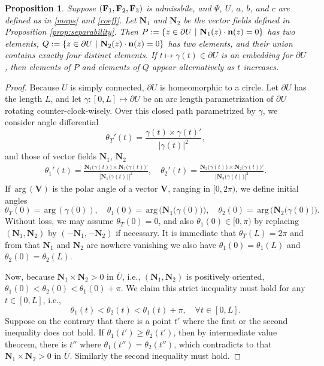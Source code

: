 \documentclass[11pt]{amsart}
\theoremstyle{plain}
\newtheorem{Prop}[Thm]{Proposition}
\theoremstyle{remark}
\numberwithin{equation}{section}
\numberwithin{Thm}{section}
\def\N{{\mathbf N}}
\def\F{{\bf F}}
\def\n{{\bf n}}
\def\arg{{\,\textrm{arg}\,}}
\begin{document}
\begin{Prop} \label{lemma:anisogeom}
Suppose $(\F_1,\F_2,\F_3)$ is admissbile, and $\Psi$, $U$, $a$, $b$, and $c$ are defined as in \eqref{maps} and \eqref{coeff}. Let $\N_1$ and $\N_2$ be the vector fields defined in Proposition \ref{prop:separability}. 
Then $P:=\left\{ z\in \partial U ~|~ \N_1(z)\cdot \n(z) = 0\right\}$ has two elements, $Q:=\left\{ z\in \partial U ~|~ \N_2(z)\cdot \n(z) = 0\right\}$ has two elements, and their union contains exactly four distinct elements. If $t \mapsto \gamma(t) \in \partial U$ is an embedding for $\partial U$, then elements of $P$ and elements of $Q$ appear alternatively as $t$ increases.
\end{Prop}
\begin{proof}
 Because $U$ is simply connected, $\partial U$ is homeomorphic to a circle. Let $\partial U$ has the length $L$, and let $\gamma : [0,L] \mapsto \partial U$ be an arc length parametrization of $\partial U$ rotating counter-clock-wisely.  Over this closed path parametrized by $\gamma$,  we consider angle differential 
 $$\theta_T'(t) = \frac{\gamma(t) \times \gamma(t)'}{|\gamma(t)|^2},$$
 and those of vector fields $\N_1$, $\N_2$
\begin{align*}
  \theta_1'(t) = \frac{\N_1\big(\gamma(t)\big) \times \N_1\big(\gamma(t)\big)'}{|\N_1\big(\gamma(t)\big)|^2}, \quad  \theta_2'(t) = \frac{\N_2\big(\gamma(t)\big) \times \N_2\big(\gamma(t)\big)'}{|\N_2\big(\gamma(t)\big)|^2}.
 \end{align*}
If $\arg(\mathbf{V})$ is the polar angle of a vector $\mathbf{V}$, ranging in $[0,2\pi)$, we define initial angles 
$$\theta_T(0) = \arg(\gamma(0)), \quad \theta_1(0) = \arg\Big(\N_1\big(\gamma(0)\big)\Big),\quad \theta_2(0) = \arg\Big(\N_2\big(\gamma(0)\big)\Big).$$
Without loss, we may assume $\theta_T(0) = 0$, and also $\theta_1(0) \in [0,\pi)$ by replacing $(\N_1,\N_2)$ by $(-\N_1,-\N_2)$ if necessary. It is immediate that $\theta_T(L) = 2\pi$ and from that $\N_1$ and $\N_2$ are nowhere vanishing we also have $\theta_1(0)=\theta_1(L)$ and $\theta_2(0)=\theta_2(L)$.

Now, because $\N_1 \times \N_2 > 0$ in $\overline U$, i.e., $(\N_1,\N_2)$ is positively oriented, $\theta_1(0) < \theta_2(0) < \theta_1(0) + \pi$. We claim this strict inequality must hold for any $t\in[0,L]$, i.e.,
\begin{equation} \label{strinq}
\theta_1(t) < \theta_2(t) < \theta_1(t) + \pi, \quad \forall t\in[0,L]. 
\end{equation}
Suppose on the contrary that there is a point $t'$ where the first or the second inequality does not hold. If $\theta_1(t') \ge \theta_2(t')$, then by intermediate value theorem, there is $t''$ where $\theta_1(t'') = \theta_2(t'')$, which contradicts to that $\N_1\times \N_2>0$ in $\overline U$. Similarly the second inequality must hold. 


\end{proof}
\end{document}
